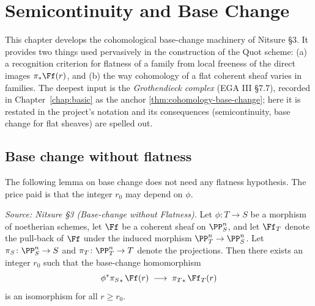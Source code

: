 \chapter{Semicontinuity and Base Change}
\label{chap:semicontinuity}

This chapter develops the cohomological base-change machinery of Nitsure §3. It
provides two things used pervasively in the construction of the Quot scheme:
(a) a recognition criterion for flatness of a family from local freeness of the
direct images $\pi_*\Ff(r)$, and (b) the way cohomology of a flat coherent sheaf
varies in families. The deepest input is the \emph{Grothendieck complex}
(EGA III §7.7), recorded in Chapter~\ref{chap:basic} as the anchor
\cref{thm:cohomology-base-change}; here it is restated in the project's notation
and its consequences (semicontinuity, base change for flat sheaves) are spelled
out.

\section{Base change without flatness}

The following lemma on base change does not need any flatness hypothesis. The
price paid is that the integer $r_0$ may depend on $\phi$.

\begin{lemma}
  \label{lem:base-change-without-flatness}
  \textit{Source: Nitsure §3 (Base-change without Flatness).}
  Let $\phi\colon T\to S$ be a morphism of noetherian schemes, let $\Ff$ be a
  coherent sheaf on $\PP^n_S$, and let $\Ff_T$ denote the pull-back of $\Ff$
  under the induced morphism $\PP^n_T\to\PP^n_S$. Let
  $\pi_S\colon \PP^n_S\to S$ and $\pi_T\colon \PP^n_T\to T$ denote the
  projections. Then there exists an integer $r_0$ such that the base-change
  homomorphism
  \[
    \phi^*{\pi_S}_*\,\Ff(r)\;\longrightarrow\;{\pi_T}_*\,\Ff_T(r)
  \]
  is an isomorphism for all $r\ge r_0$.
\end{lemma}

